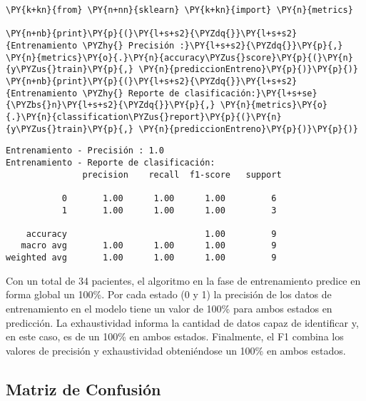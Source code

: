     \begin{tcolorbox}[breakable, size=fbox, boxrule=1pt, pad at break*=1mm,colback=cellbackground, colframe=cellborder]
\begin{Verbatim}[commandchars=\\\{\}]
\PY{k+kn}{from} \PY{n+nn}{sklearn} \PY{k+kn}{import} \PY{n}{metrics}

\PY{n+nb}{print}\PY{p}{(}\PY{l+s+s2}{\PYZdq{}}\PY{l+s+s2}{Entrenamiento \PYZhy{} Precisión :}\PY{l+s+s2}{\PYZdq{}}\PY{p}{,} \PY{n}{metrics}\PY{o}{.}\PY{n}{accuracy\PYZus{}score}\PY{p}{(}\PY{n}{y\PYZus{}train}\PY{p}{,} \PY{n}{prediccionEntreno}\PY{p}{)}\PY{p}{)}
\PY{n+nb}{print}\PY{p}{(}\PY{l+s+s2}{\PYZdq{}}\PY{l+s+s2}{Entrenamiento \PYZhy{} Reporte de clasificación:}\PY{l+s+se}{\PYZbs{}n}\PY{l+s+s2}{\PYZdq{}}\PY{p}{,} \PY{n}{metrics}\PY{o}{.}\PY{n}{classification\PYZus{}report}\PY{p}{(}\PY{n}{y\PYZus{}train}\PY{p}{,} \PY{n}{prediccionEntreno}\PY{p}{)}\PY{p}{)}
\end{Verbatim}
\end{tcolorbox}

    \begin{Verbatim}[commandchars=\\\{\}]
Entrenamiento - Precisión : 1.0
Entrenamiento - Reporte de clasificación:
               precision    recall  f1-score   support

           0       1.00      1.00      1.00         6
           1       1.00      1.00      1.00         3

    accuracy                           1.00         9
   macro avg       1.00      1.00      1.00         9
weighted avg       1.00      1.00      1.00         9

    \end{Verbatim}

    Con un total de 34 pacientes, el algoritmo en la fase de entrenamiento predice en forma global un 100\%. Por cada estado (0 y 1) la precisión de los datos de entrenamiento en el modelo tiene un valor de 100\% para ambos estados en predicción. La exhaustividad informa la cantidad de datos capaz de identificar y, en este caso, es de un 100\% en ambos estados. Finalmente, el F1 combina los valores de precisión y exhaustividad obteniéndose un 100\% en ambos estados.
    
    \hypertarget{matriz-de-confusiuxf3n}{%
\subsection{Matriz de Confusión}\label{matriz-de-confusiuxf3n}}

